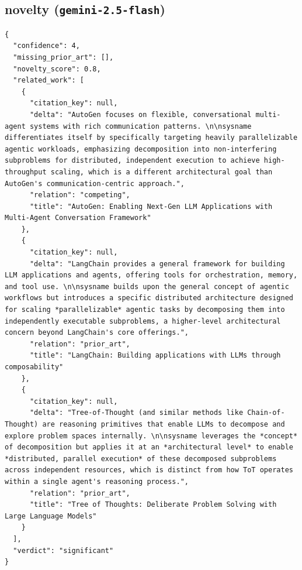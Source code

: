\documentclass[11pt]{article}
\begin{document}
\subsection*{novelty (\texttt{gemini-2.5-flash})}
\begin{verbatim}
{
  "confidence": 4,
  "missing_prior_art": [],
  "novelty_score": 0.8,
  "related_work": [
    {
      "citation_key": null,
      "delta": "AutoGen focuses on flexible, conversational multi-agent systems with rich communication patterns. \n\nsysname differentiates itself by specifically targeting heavily parallelizable agentic workloads, emphasizing decomposition into non-interfering subproblems for distributed, independent execution to achieve high-throughput scaling, which is a different architectural goal than AutoGen's communication-centric approach.",
      "relation": "competing",
      "title": "AutoGen: Enabling Next-Gen LLM Applications with Multi-Agent Conversation Framework"
    },
    {
      "citation_key": null,
      "delta": "LangChain provides a general framework for building LLM applications and agents, offering tools for orchestration, memory, and tool use. \n\nsysname builds upon the general concept of agentic workflows but introduces a specific distributed architecture designed for scaling *parallelizable* agentic tasks by decomposing them into independently executable subproblems, a higher-level architectural concern beyond LangChain's core offerings.",
      "relation": "prior_art",
      "title": "LangChain: Building applications with LLMs through composability"
    },
    {
      "citation_key": null,
      "delta": "Tree-of-Thought (and similar methods like Chain-of-Thought) are reasoning primitives that enable LLMs to decompose and explore problem spaces internally. \n\nsysname leverages the *concept* of decomposition but applies it at an *architectural level* to enable *distributed, parallel execution* of these decomposed subproblems across independent resources, which is distinct from how ToT operates within a single agent's reasoning process.",
      "relation": "prior_art",
      "title": "Tree of Thoughts: Deliberate Problem Solving with Large Language Models"
    }
  ],
  "verdict": "significant"
}
\end{verbatim}
\end{document}
